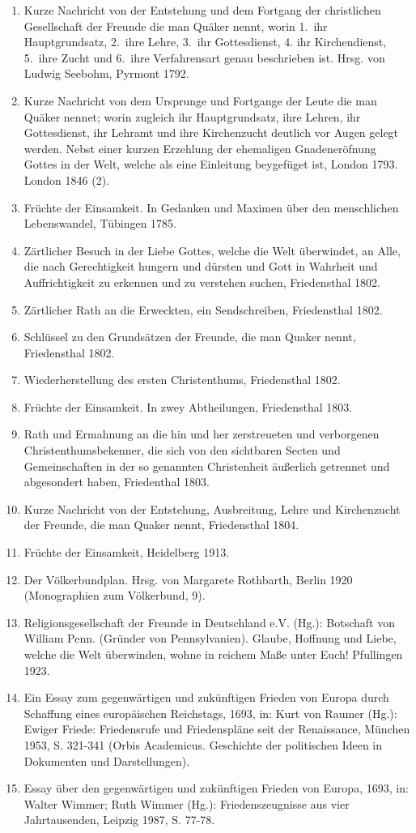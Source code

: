 \begin{enumerate}
 \item Kurze Nachricht von der Entstehung und dem Fortgang der christlichen
Gesellschaft der Freunde
die man Quäker nennt,
worin 1.~ihr Hauptgrundsatz, 2.~ihre Lehre, 3.~ihr Gottesdienst, 4. ihr Kirchendienst, 5.~ihre Zucht und 6.~ihre Verfahrensart genau beschrieben ist. Hrsg. von Ludwig Seebohm, Pyrmont 1792.
 \item Kurze Nachricht von dem Ursprunge und Fortgange der Leute die man
Quäker nennet; worin zugleich ihr Hauptgrundsatz, ihre Lehren, ihr
Gottesdienst, ihr Lehramt und ihre Kirchenzucht deutlich vor Augen gelegt werden.
Nebst einer kurzen Erzehlung der ehemaligen Gnadeneröfnung Gottes
in der Welt, welche als eine Einleitung beygefüget ist, London 1793. London 1846 (2).
 \item Früchte der Einsamkeit. In Gedanken und Maximen über den menschlichen
Lebenswandel, Tübingen 1785.
 \item Zärtlicher Besuch in der Liebe Gottes, welche die Welt überwindet, an
Alle, die nach Gerechtigkeit hungern und dürsten und Gott in Wahrheit und
Auffrichtigkeit zu erkennen und zu verstehen suchen, Friedensthal 1802.
 \item Zärtlicher Rath an die Erweckten, ein Sendschreiben, Friedensthal 1802.
 \item Schlüssel zu den Grundsätzen der Freunde, die man Quaker nennt,
Friedensthal 1802.
 \item Wiederherstellung des ersten Christenthums, Friedensthal 1802.
 \item Früchte der Einsamkeit. In zwey Abtheilungen, Friedensthal 1803.
 \item Rath und Ermahnung an die hin und her zerstreueten und verborgenen
Christenthumsbekenner, die sich von den sichtbaren Secten und Gemeinschaften
in der so genannten Christenheit äußerlich
getrennet und abgesondert haben, Friedenthal 1803.
 \item Kurze Nachricht von der Entstehung, Ausbreitung, Lehre und Kirchenzucht
der Freunde, die man Quaker nennt, Friedensthal 1804.
 \item Früchte der Einsamkeit, Heidelberg 1913.
 \item Der Völkerbundplan. Hrsg. von Margarete Rothbarth, Berlin 1920
(Monographien zum Völkerbund, 9).
 \item Religionsgesellschaft der Freunde in Deutschland e.V. (Hg.): Botschaft
von William Penn. (Gründer von Pennsylvanien). Glaube, Hoffnung und Liebe,
welche die Welt überwinden, wohne in reichem Maße unter Euch! Pfullingen 1923.
 \item Ein Essay zum gegenwärtigen und zukünftigen Frieden von Europa durch
Schaffung eines europäischen Reichstags,
1693, in: Kurt von Raumer (Hg.): Ewiger Friede: Friedensrufe und Friedenspläne seit der Renaissance, München 1953, S. 321-341 (Orbis Academicus. Geschichte der politischen Ideen in Dokumenten und Darstellungen).
 \item Essay über den gegenwärtigen und zukünftigen Frieden von Europa, 1693,
in: Walter Wimmer; Ruth Wimmer (Hg.): Friedenszeugnisse aus vier
Jahrtausenden, Leipzig 1987, S. 77-78.
\end{enumerate}
